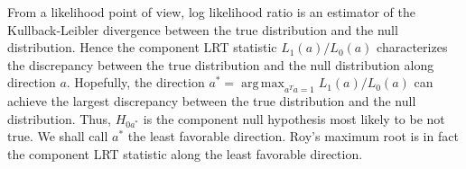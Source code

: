 \documentclass[12pt]{article} %
\DeclareMathOperator*{\argmax}{arg\,max}
\theoremstyle{definition}
\begin{document}
From a likelihood point of view, log likelihood ratio is an estimator of the Kullback-Leibler divergence between the true distribution and the null distribution.
Hence the component LRT statistic $L_1(a)/L_0(a)$ characterizes the discrepancy between  the true distribution and the null distribution along direction $a$.
Hopefully, the direction $a^*=\argmax_{a^T a=1}L_1(a)/L_0(a)$ can achieve the largest discrepancy between the true distribution and the null distribution.
Thus, $H_{0a^*}$ is the component null hypothesis most likely to be not true.
We shall call $a^*$ the least favorable direction. %
Roy's maximum root is in fact the component LRT statistic along the least favorable direction.




\end{document}
